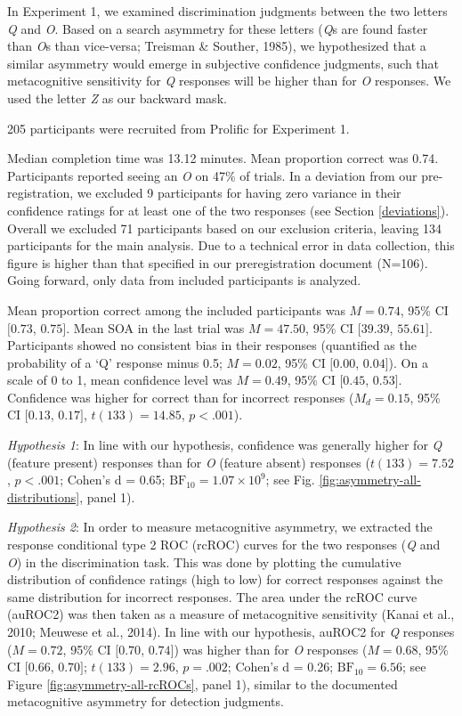 \documentclass[12pt,twoside]{reedthesis}
\begin{document}
In Experiment 1, we examined discrimination judgments between the two letters \emph{Q} and \emph{O}. Based on a search asymmetry for these letters (\emph{Q}s are found faster than \emph{O}s than vice-versa; Treisman \& Souther, 1985), we hypothesized that a similar asymmetry would emerge in subjective confidence judgments, such that metacognitive sensitivity for \emph{Q} responses will be higher than for \emph{O} responses. We used the letter \emph{Z} as our backward mask.

205 participants were recruited from Prolific for Experiment 1.

Median completion time was 13.12 minutes. Mean proportion correct was 0.74. Participants reported seeing an \emph{O} on 47\% of trials. In a deviation from our pre-registration, we excluded 9 participants for having zero variance in their confidence ratings for at least one of the two responses (see Section \ref{deviations}). Overall we excluded 71 participants based on our exclusion criteria, leaving 134 participants for the main analysis. Due to a technical error in data collection, this figure is higher than that specified in our preregistration document (N=106). Going forward, only data from included participants is analyzed.

Mean proportion correct among the included participants was \(M = 0.74\), 95\% CI \([0.73\), \(0.75]\). Mean SOA in the last trial was \(M = 47.50\), 95\% CI \([39.39\), \(55.61]\). Participants showed no consistent bias in their responses (quantified as the probability of a `Q' response minus 0.5; \(M = 0.02\), 95\% CI \([0.00\), \(0.04]\)). On a scale of 0 to 1, mean confidence level was \(M = 0.49\), 95\% CI \([0.45\), \(0.53]\). Confidence was higher for correct than for incorrect responses (\(M_d = 0.15\), 95\% CI \([0.13\), \(0.17]\), \(t(133) = 14.85\), \(p < .001\)).

\emph{Hypothesis 1}: In line with our hypothesis, confidence was generally higher for \emph{Q} (feature present) responses than for \emph{O} (feature absent) responses (\(t(133) = 7.52\), \(p < .001\); Cohen's d = 0.65; \(\mathrm{BF}_{\textrm{10}} = 1.07 \times 10^{9}\); see Fig. \ref{fig:asymmetry-all-distributions}, panel 1).

\emph{Hypothesis 2}: In order to measure metacognitive asymmetry, we extracted the response conditional type 2 ROC (rcROC) curves for the two responses (\emph{Q} and \emph{O}) in the discrimination task. This was done by plotting the cumulative distribution of confidence ratings (high to low) for correct responses against the same distribution for incorrect responses. The area under the rcROC curve (auROC2) was then taken as a measure of metacognitive sensitivity (Kanai et al., 2010; Meuwese et al., 2014). In line with our hypothesis, auROC2 for \emph{Q} responses (\(M = 0.72\), 95\% CI \([0.70\), \(0.74]\)) was higher than for \emph{O} responses (\(M = 0.68\), 95\% CI \([0.66\), \(0.70]\); \(t(133) = 2.96\), \(p = .002\); Cohen's d = 0.26; \(\mathrm{BF}_{\textrm{10}} = 6.56\); see Figure \ref{fig:asymmetry-all-rcROCs}, panel 1), similar to the documented metacognitive asymmetry for detection judgments.
\end{document}
